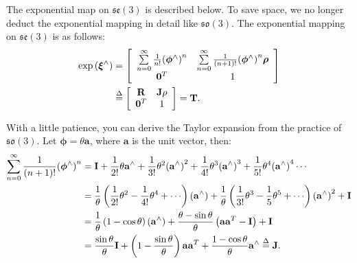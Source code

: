 The exponential map on $\mathfrak{se}(3)$ is described below. To save space, we no longer deduct the exponential mapping in detail like $\mathfrak{so}(3)$. The exponential mapping on $\mathfrak{se}(3)$ is as follows:
\begin{align}
\exp \left( {{ \boldsymbol{\xi} ^ \wedge }} \right) &= \left[ {\begin{array}{*{20}{c}}
    {\sum\limits_{n = 0}^\infty {\frac{1}{{n!}}{{\left( {{\boldsymbol{\phi} ^ \wedge }} \right)}^n} } }&{\sum\limits_{n = 0}^\infty {\frac{1}{{\left( {n + 1} \right)!}}{{\left( {{\boldsymbol{\phi } ^ \wedge }} \right)}^n} \boldsymbol{\rho} } }\\
    {{\mathbf{0}^T}}&1
    \end{array}} \right] \\
&\buildrel \Delta \over = \left[ {\begin{array}{*{20}{c}}
    \mathbf{R} &{\mathbf{J\rho} } \\
    {{\mathbf{0}^T}}&1
    \end{array}} \right] = \mathbf{T}.
\end{align}

With a little patience, you can derive the Taylor expansion from the practice of $\mathfrak{so}(3)$. Let $\boldsymbol{\phi}=\theta \mathbf{a}$, where $\mathbf{a}$ is the unit vector, then:
\begin{equation}
\begin{aligned}
\sum\limits_{n = 0}^\infty {\frac{1}{{\left( {n + 1} \right)!}}{{\left( {{\boldsymbol{\phi} ^ \wedge }} \right)}^n}} &= \mathbf{I} + \frac{1}{{2!}}\theta {\mathbf{a}^ \wedge } + \frac{1}{{3 !}}{\theta ^2}{\left( {{\mathbf{a}^ \wedge }} \right)^2} + \frac{1}{{4!}}{\theta ^3}{ \left( {{\mathbf{a}^ \wedge }} \right)^3} + \frac{1}{{5!}}{\theta ^4}{\left( {{\mathbf{a} ^ \wedge }} \right)^4} \cdots \\
&= \frac{1}{\theta }\left( {\frac{1}{{2!}}{\theta ^2} - \frac{1}{{4!}}{\theta ^4} + \cdots } \right)\left( {{\mathbf{a}^ \wedge }} \right) + \frac{1}{\theta }\left( {\frac{1}{{3!}} {\theta ^3} - \frac{1}{5}{\theta ^5} + \cdots } \right){\left( {{\mathbf{a}^ \wedge }} \right)^2} + \mathbf{I}\\
&= \frac{1}{\theta }\left( {1 - \cos \theta } \right)\left( {{\mathbf{a}^ \wedge }} \right) + \frac{{\theta - \sin \theta }}{\theta }\left( {\mathbf{a}{\mathbf{a}^T} - \mathbf{I}} \right) + \mathbf{I}\\
&= \frac{{\sin \theta }}{\theta }\mathbf{I} + \left( {1 - \frac{{\sin \theta }}{\theta }} \right)\mathbf{a }{\mathbf{a}^T} + \frac{{1 - \cos \theta }}{\theta }{\mathbf{a}^ \wedge } \buildrel \Delta \over = \mathbf{J}.
\end{aligned}
\end{equation}

